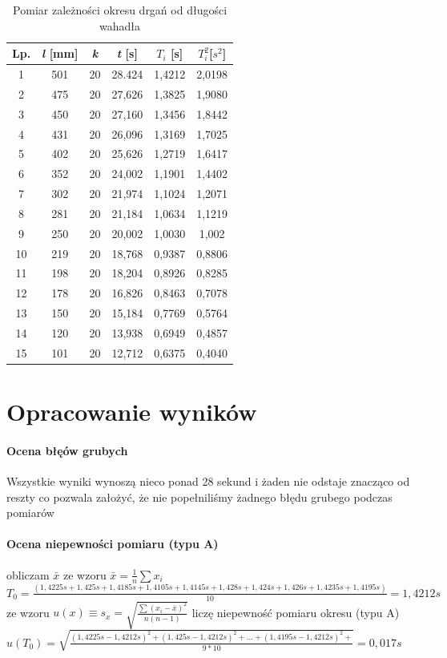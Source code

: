 \documentclass[a4paper,10pt,twoside]{article}
\begin{document}
	\begin{table}[!htbp]
		\caption{Pomiar zależności okresu drgań od długości wahadła}
		\centering
		\def\arraystretch{1.4}
		\begin{tabular}{|c|c|c|c|c|c|}
			\hline
			Lp. & \textit{l} [mm] & \textit{k} & \textit{t} [s] & $ T_i$ [s] & $T_i^2$[$s^2$] \\ \hline
			1 &501& 20 & 28.424 & 1,4212 & 2,0198\\ \hline
			2 &475& 20 & 27,626 & 1,3825 & 1,9080\\ \hline
			3 &450& 20 & 27,160 & 1,3456 & 1,8442\\ \hline
			4 &431& 20 & 26,096& 1,3169 & 1,7025\\ \hline
			5 &402& 20 & 25,626& 1,2719 & 1,6417\\ \hline
			6 &352& 20 & 24,002 & 1,1901 & 1,4402\\ \hline
			7 &302& 20 & 21,974 & 1,1024 &1,2071\\ \hline
			8 &281& 20 & 21,184 & 1,0634 & 1,1219\\ \hline
			9 &250& 20 & 20,002 & 1,0030 & 1,002\\ \hline
			10 &219& 20 & 18,768 & 0,9387 &0,8806\\ \hline
			11 &198& 20 & 18,204 & 0,8926 &0,8285\\ \hline
			12 &178& 20 & 16,826 & 0,8463 &0,7078\\ \hline
			13 &150& 20 & 15,184 & 0,7769 &0,5764\\ \hline
			14 &120& 20 & 13,938 & 0,6949 &0,4857\\ \hline
			15 &101& 20 & 12,712 & 0,6375 &0,4040\\ \hline
		\end{tabular}
	\end{table}
	
	\section{Opracowanie wyników}
	\noindent
	
	\paragraph{Ocena błęów grubych} Wszystkie wyniki wynoszą nieco ponad 28 sekund i żaden nie odstaje znacząco od reszty co pozwala założyć, że nie popełniliśmy żadnego błędu grubego podczas pomiarów
	
	\paragraph{Ocena niepewności pomiaru (typu A)} obliczam $\bar{x}$ ze wzoru $\bar{x} = \frac{1}{n} \sum x_i$ \\
	$T_0 = \frac{(1,4225s +	1,425s +	1,4185s +
	1,4105s + 
	1,4145s +
	1,428s +
	1,424s +
	1,426s +
	1,4235s + 
	1,4195s)}{10} = 1,4212s
	$ \\
	ze wzoru $u(x) \equiv s_x = \sqrt{\frac{\sum(x_i - \bar{x})^2}{n(n-1)}}$ liczę niepewność pomiaru okresu (typu A)\\ $u(T_0) = \sqrt{\frac{(1,4225s-1,4212s)^2 + (1,425s- 1,4212s)^2 + ... +(1,4195s-1,4212s)^2 +}{9*10}} = 0,017s $
\end{document}
